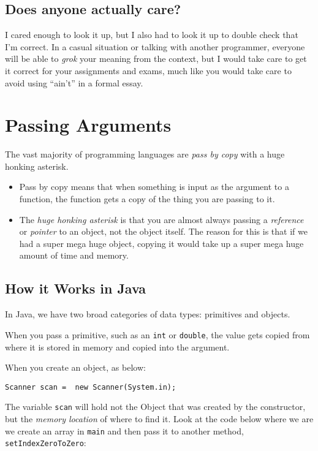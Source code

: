 \subsection{Does anyone actually care?}

I cared enough to look it up, but I also had to look it up to double check that I'm correct.  
In a casual situation or talking with another programmer, everyone will be able to \textit{grok} your meaning from the context, but I would take care to get it correct for your assignments and exams, much like you would take care to avoid using ``ain't'' in a formal essay.

\section{Passing Arguments}

The vast majority of programming languages are \textit{pass by copy} with a huge honking asterisk.
\begin{itemize}
	\item Pass by copy means that when something is input as the argument to a function, the function gets a copy of the thing you are passing to it.
	\item The \textit{huge honking asterisk} is that you are almost always passing a \textit{reference} or \textit{pointer} to an object, not the object itself.  The reason for this is that if we had a super mega huge object, copying it would take up a super mega huge amount of time and memory.
\end{itemize}



\subsection{How it Works in Java}
In Java, we have two broad categories of data types: primitives and objects.

When you pass a primitive, such as an \texttt{int} or \texttt{double}, the value gets copied from where it is stored in memory and copied into the argument.

When you create an object, as below:
\begin{verbatim}
Scanner scan =  new Scanner(System.in);
\end{verbatim}

The variable \texttt{scan} will hold not the Object that was created by the constructor, but the \textit{memory location} of where to find it.
Look at the code below where we are we create an array in \texttt{main} and then pass it to another method, \texttt{setIndexZeroToZero}:

